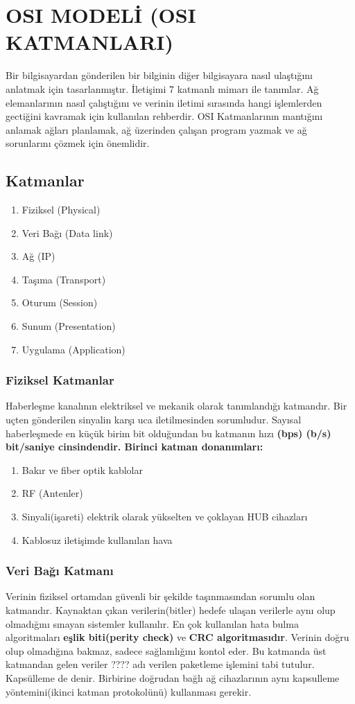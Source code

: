 \section{OSI MODELİ (OSI KATMANLARI)}
Bir bilgisayardan gönderilen bir bilginin diğer bilgisayara nasıl ulaştığını anlatmak için tasarlanmıştır.
İletişimi 7 katmanlı mimarı ile tanımlar. Ağ elemanlarının nasıl çalıştığını ve verinin iletimi sırasında hangi işlemlerden gectiğini kavramak için kullanılan rehberdir.
OSI Katmanlarının mantığını anlamak ağları planlamak, ağ üzerinden çalışan program yazmak ve ağ sorunlarını çözmek için önemlidir.
\subsection{Katmanlar}
\begin{enumerate}
	\item Fiziksel (Physical)
	\item Veri Bağı (Data link)
	\item Ağ (IP)
	\item Taşıma (Transport)
	\item Oturum (Session)
	\item Sunum (Presentation)
	\item Uygulama (Application)
\end{enumerate}

\subsubsection{Fiziksel Katmanlar}
Haberleşme kanalının elektriksel ve mekanik olarak tanımlandığı katmandır. Bir uçten gönderilen sinyalin karşı uca iletilmesinden sorumludur. Sayısal haberleşmede en küçük birim bit olduğundan bu katmanın hızı \bf{(bps) (b/s) bit/saniye} cinsindendir.
Birinci katman donanımları:
\begin{enumerate}
	\item Bakır ve fiber optik kablolar
	\item RF (Antenler)
	\item Sinyali(işareti) elektrik olarak yükselten ve çoklayan HUB cihazları
	\item Kablosuz iletişimde kullanılan hava
\end{enumerate}

\subsubsection{Veri Bağı Katmanı}
Verinin fiziksel ortamdan güvenli bir şekilde taşınmasından sorumlu olan katmandır. Kaynaktan çıkan verilerin(bitler) hedefe ulaşan verilerle aynı olup olmadığını sınayan sistemler kullanılır.
En çok kullanılan hata bulma algoritmaları \textbf{eşlik biti(perity check)} ve \textbf{CRC algoritmasıdır}. Verinin doğru olup olmadığına bakmaz, sadece sağlamlığını kontol eder.
Bu katmanda üst katmandan gelen veriler ???? adı verilen paketleme işlemini tabi tutulur. Kapsülleme de denir. Birbirine doğrudan bağlı ağ cihazlarının aynı kapsulleme yöntemini(ikinci katman protokolünü) kullanması gerekir.


